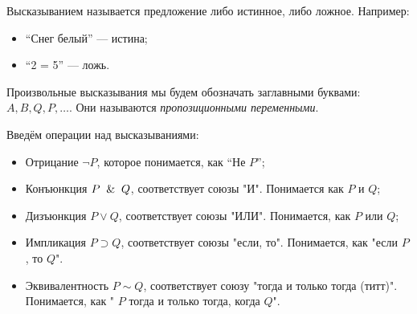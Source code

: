 \begin{definition}
	Высказыванием называется предложение либо истинное, либо ложное. Например:
	\begin{itemize}
		\item ``Снег белый'' --- истина;
		\item ``2  = 5'' --- ложь.
	\end{itemize}

	Произвольные высказывания мы будем обозначать заглавными буквами:
	$A, B, Q, P, \dots$. Они называются \emph{пропозиционными
		переменными}.
\end{definition}

Введём операции над высказываниями:
\begin{itemize}
	\item Отрицание $\neg P$, которое понимается, как ``Не $P$'';
	\item Конъюнкция $P \And Q$, соответствует союзы "И". Понимается
	      как $P$ и $Q$;
	\item  Дизъюнкция $P \vee Q$, соответствует союзы "ИЛИ".
	      Понимается, как $P$ или $Q$;
	\item Импликация $P \supset Q$, соответствует союзы "если, то".
	      Понимается, как "если $P$, то $Q$".
	\item Эквивалентность $P \sim Q$, соответствует союзу "тогда и
	      только тогда (титт)". Понимается, как " $P$ тогда и только тогда,
	      когда $Q$".
\end{itemize}
